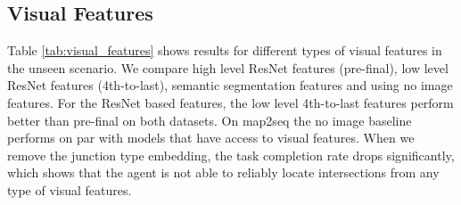 \documentclass[11pt]{article}
\begin{document}
\subsection{Visual Features}
\begin{table}[]
\centering
{}
\caption{Study of visual features for the unseen scenario of Touchdown and map2seq. Metric is task completion.}
\label{tab:visual_features}
\end{table}
 Table \ref{tab:visual_features} shows results for different types of visual features in the unseen scenario. We compare high level ResNet features (pre-final), low level ResNet features (4th-to-last), semantic segmentation features and using no image features. For the ResNet based features, the low level 4th-to-last features perform better than pre-final on both datasets. On map2seq the no image baseline performs on par with models that have access to visual features. When we remove the junction type embedding, the task completion rate drops significantly, which shows that the agent is not able to reliably locate intersections from any type of visual features.
\end{document}
